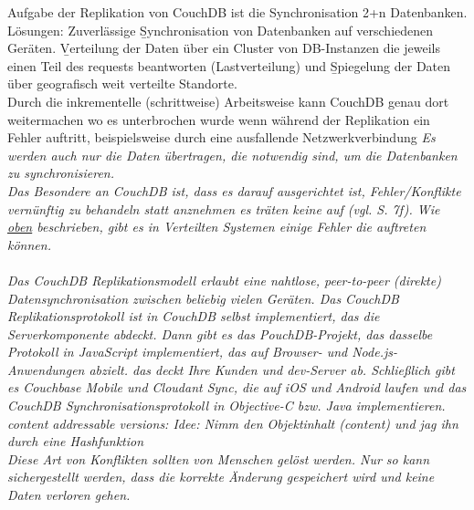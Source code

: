
Aufgabe der Replikation von CouchDB ist die Synchronisation 2+n Datenbanken. Lösungen: Zuverlässige \b{Synchronisation} von Datenbanken auf verschiedenen Geräten. \b{Verteilung} der Daten über ein Cluster von DB-Instanzen die jeweils einen Teil des requests beantworten (Lastverteilung) und \b{Spiegelung} der Daten über geografisch weit verteilte Standorte.\\
Durch die inkrementelle (schrittweise) Arbeitsweise kann CouchDB genau dort weitermachen wo es unterbrochen wurde wenn während der Replikation ein Fehler auftritt, beispielsweise durch eine ausfallende Netzwerkverbindung
\it{Es werden auch nur die Daten übertragen, die notwendig sind, um die Datenbanken zu synchronisieren.}\\
Das Besondere an CouchDB ist, dass es darauf ausgerichtet ist, Fehler/Konflikte vernünftig zu behandeln statt anznehmen es träten keine auf (vgl. \cite{couchDB} S. 7f). Wie \hyperref[sec:conflict]{oben} beschrieben, gibt es in Verteilten Systemen einige Fehler die auftreten können.\\\\
\it{Das CouchDB Replikationsmodell erlaubt eine nahtlose, peer-to-peer (direkte) Datensynchronisation zwischen beliebig vielen Geräten. Das CouchDB Replikationsprotokoll ist in CouchDB selbst implementiert, das die Serverkomponente abdeckt. Dann gibt es das PouchDB-Projekt, das dasselbe Protokoll in JavaScript implementiert, das auf Browser- und Node.js-Anwendungen abzielt. das deckt Ihre Kunden und dev-Server ab. Schließlich gibt es Couchbase Mobile und Cloudant Sync, die auf iOS und Android laufen und das CouchDB Synchronisationsprotokoll in Objective-C bzw. Java implementieren.}\\
content addressable versions: Idee: Nimm den Objektinhalt (content) und jag ihn durch eine \gls{Hashfunktion}\\
%
Diese Art von Konflikten sollten von Menschen gelöst werden. Nur so kann sichergestellt werden, dass die korrekte Änderung gespeichert wird und keine Daten verloren gehen.
%


